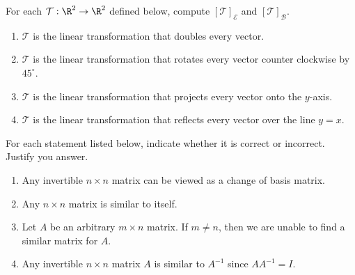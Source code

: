 \begin{exercises}
\begin{problist}
	    For each $\mathcal T:\R^2\to\R^2$ defined below, compute $[\mathcal T]_{\mathcal E}$ and $[\mathcal T]_{\mathcal B}$.
	        \begin{enumerate}
	            \item   $\mathcal T$ is the linear transformation that doubles every vector.
			    \item   $\mathcal T$ is the linear transformation that rotates every vector counter clockwise by $45^\circ$.
			    \item   $\mathcal T$ is the linear transformation that projects every vector onto the $y$-axis.
			    \item   $\mathcal T$ is the linear transformation that reflects every vector over the line $y=x$.
	        \end{enumerate}
        
        \prob For each statement listed below, indicate whether it is correct or incorrect. Justify you answer.
        \begin{enumerate}
            \item   Any invertible $n \times n$ matrix can be viewed as a change of basis matrix.
            \item   Any $n \times n$ matrix is similar to itself.
            \item   Let $A$ be an arbitrary $m \times n$ matrix. If $m \neq n$, then we are unable to find a similar matrix for $A$.
            \item   Any invertible $n \times n$ matrix $A$ is similar to $A^{-1}$ since $AA^{-1}=I$.
        \end{enumerate}
	\end{problist}
\end{exercises}
